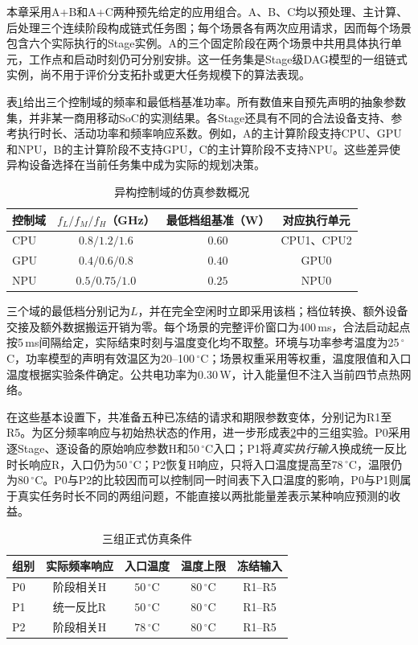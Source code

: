 本章采用A+B和A+C两种预先给定的应用组合。A、B、C均以预处理、主计算、后处理三个连续阶段构成链式任务图；每个场景各有两次应用请求，因而每个场景包含六个实际执行的Stage实例。A的三个固定阶段在两个场景中共用具体执行单元，工作点和启动时刻仍可分别安排。这一任务集是Stage级DAG模型的一组链式实例，尚不用于评价分支拓扑或更大任务规模下的算法表现。

表\ref{tab:c3-platform}给出三个控制域的频率和最低档基准功率。所有数值来自预先声明的抽象参数集，并非某一商用移动SoC的实测结果。各Stage还具有不同的合法设备支持、参考执行时长、活动功率和频率响应系数。例如，A的主计算阶段支持CPU、GPU和NPU，B的主计算阶段不支持GPU，C的主计算阶段不支持NPU。这些差异使异构设备选择在当前任务集中成为实际的规划决策。

\begin{table}[htbp]
 \centering
 \caption{异构控制域的仿真参数概况}
 \label{tab:c3-platform}
 \begin{tabular}{lccc}
 \toprule
 控制域 & $f_L/f_M/f_H$（GHz） & 最低档组基准（W） & 对应执行单元\\
 \midrule
 CPU & $0.8/1.2/1.6$ & $0.60$ & CPU1、CPU2\\
 GPU & $0.4/0.6/0.8$ & $0.40$ & GPU0\\
 NPU & $0.5/0.75/1.0$ & $0.25$ & NPU0\\
 \bottomrule
 \end{tabular}
\end{table}

三个域的最低档分别记为$L$，并在完全空闲时立即采用该档；档位转换、额外设备交接及额外数据搬运开销为零。每个场景的完整评价窗口为400\,ms，合法启动起点按5\,ms间隔给定，实际结束时刻与温度变化均不取整。环境与功率参考温度为25\,$^\circ$C，功率模型的声明有效温区为20--100\,$^\circ$C；场景权重采用等权重，温度限值和入口温度根据实验条件确定。公共电功率为0.30\,W，计入能量但不注入当前四节点热网络。

在这些基本设置下，共准备五种已冻结的请求和期限参数变体，分别记为R1至R5。为区分频率响应与初始热状态的作用，进一步形成表\ref{tab:c3-experiment-groups}中的三组实验。P0采用逐Stage、逐设备的原始响应参数H和50\,$^\circ$C入口；P1将\emph{真实执行输入}换成统一反比时长响应R，入口仍为50\,$^\circ$C；P2恢复H响应，只将入口温度提高至78\,$^\circ$C，温限仍为80\,$^\circ$C。P0与P2的比较因而可以控制同一时间表下入口温度的影响，P0与P1则属于真实任务时长不同的两组问题，不能直接以两批能量差表示某种响应预测的收益。

\begin{table}[htbp]
 \centering
 \caption{三组正式仿真条件}
 \label{tab:c3-experiment-groups}
 \begin{tabular}{lcccc}
 \toprule
 组别 & 实际频率响应 & 入口温度 & 温度上限 & 冻结输入\\
 \midrule
 P0 & 阶段相关H & $50\,^\circ$C & $80\,^\circ$C & R1--R5\\
 P1 & 统一反比R & $50\,^\circ$C & $80\,^\circ$C & R1--R5\\
 P2 & 阶段相关H & $78\,^\circ$C & $80\,^\circ$C & R1--R5\\
 \bottomrule
 \end{tabular}
\end{table}

